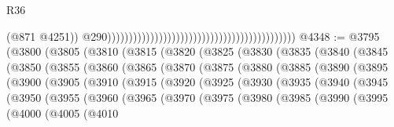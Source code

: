 \begin{lexlean}{R36}
\begin{coremodule}
                                                                                              (@871
                                                                                                @4251))
                                                                                            @290))))))))))))))))))))))))))))))))))))))))))))
@4348 := @3795
    (@3800
      (@3805
        (@3810
          (@3815
            (@3820
              (@3825
                (@3830
                  (@3835
                    (@3840
                      (@3845
                        (@3850
                          (@3855
                            (@3860
                              (@3865
                                (@3870
                                  (@3875
                                    (@3880
                                      (@3885
                                        (@3890
                                          (@3895
                                            (@3900
                                              (@3905
                                                (@3910
                                                  (@3915
                                                    (@3920
                                                      (@3925
                                                        (@3930
                                                          (@3935
                                                            (@3940
                                                              (@3945
                                                                (@3950
                                                                  (@3955
                                                                    (@3960
                                                                      (@3965
                                                                        (@3970
                                                                          (@3975
                                                                            (@3980
                                                                              (@3985
                                                                                (@3990
                                                                                  (@3995
                                                                                    (@4000
                                                                                      (@4005
                                                                                        (@4010

\end{coremodule}
\end{lexlean}
